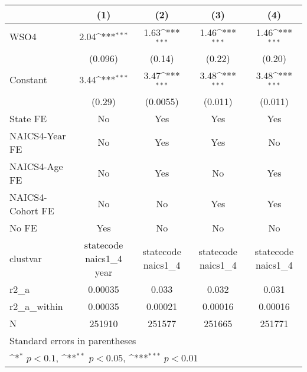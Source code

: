 {
\def\sym#1{\ifmmode^{#1}\else\(^{#1}\)\fi}
\begin{tabular}{l*{4}{c}}
\hline\hline
                    &\multicolumn{1}{c}{(1)}         &\multicolumn{1}{c}{(2)}         &\multicolumn{1}{c}{(3)}         &\multicolumn{1}{c}{(4)}         \\
\hline
WSO4                &        2.04\sym{***}&        1.63\sym{***}&        1.46\sym{***}&        1.46\sym{***}\\
                    &     (0.096)         &      (0.14)         &      (0.22)         &      (0.20)         \\
[1em]
Constant            &        3.44\sym{***}&        3.47\sym{***}&        3.48\sym{***}&        3.48\sym{***}\\
                    &      (0.29)         &    (0.0055)         &     (0.011)         &     (0.011)         \\
[1em]
State FE            &          No         &         Yes         &         Yes         &         Yes         \\
[1em]
NAICS4-Year FE      &          No         &         Yes         &         Yes         &          No         \\
[1em]
NAICS4-Age FE       &          No         &         Yes         &          No         &         Yes         \\
[1em]
NAICS4-Cohort FE    &          No         &          No         &         Yes         &         Yes         \\
[1em]
No FE               &         Yes         &          No         &          No         &          No         \\
\hline
clustvar            &statecode naics1\_4 year         &statecode naics1\_4         &statecode naics1\_4         &statecode naics1\_4         \\
r2\_a                &     0.00035         &       0.033         &       0.032         &       0.031         \\
r2\_a\_within         &     0.00035         &     0.00021         &     0.00016         &     0.00016         \\
N                   &      251910         &      251577         &      251665         &      251771         \\
\hline\hline
\multicolumn{5}{l}{\footnotesize Standard errors in parentheses}\\
\multicolumn{5}{l}{\footnotesize \sym{*} \(p<0.1\), \sym{**} \(p<0.05\), \sym{***} \(p<0.01\)}\\
\end{tabular}
}
